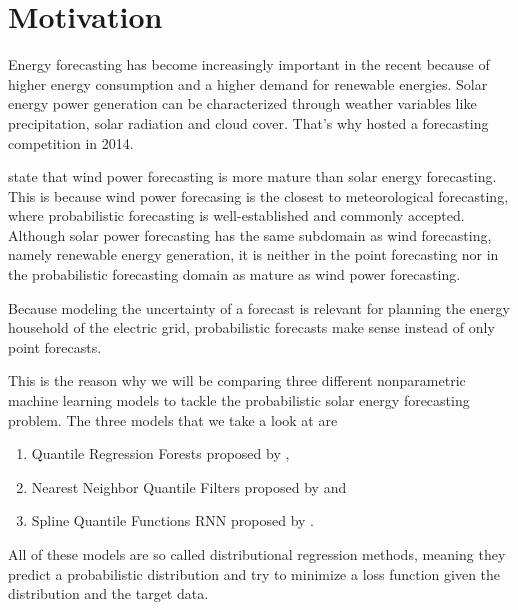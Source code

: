 \section{Motivation}
\label{sec:motivation}

Energy forecasting has become increasingly important in the recent 
because of higher energy consumption and a higher demand for renewable energies. 
Solar energy power generation can be characterized through weather variables like 
precipitation, solar radiation and cloud cover. 
That's why \Textcite{Hong2016} hosted a forecasting competition in 2014. 

\Textcite{Hong2016} state that wind power forecasting is 
more mature than solar energy forecasting. This is because 
wind power forecasing is the closest to meteorological forecasting, 
where probabilistic forecasting is well-established and commonly accepted.
Although solar power forecasting has the same subdomain as wind forecasting, 
namely renewable energy generation, it is neither in the 
point forecasting nor in the probabilistic forecasting domain as mature 
as wind power forecasting. 

Because modeling the uncertainty of a forecast is relevant for planning 
the energy household of the electric grid, probabilistic forecasts 
make sense instead of only point forecasts. 

This is the reason why we will be comparing three different nonparametric 
machine learning models to tackle the probabilistic solar energy forecasting 
problem. 
The three models that we take a look at are 
\begin{enumerate}
    \item Quantile Regression Forests proposed by \Textcite{Meinshausen2006},
    \item Nearest Neighbor Quantile Filters proposed by \Textcite{Ordiano2019} and
    \item Spline Quantile Functions RNN proposed by \Textcite{Gasthaus2019}.
\end{enumerate}
All of these models are so called distributional regression methods, meaning 
they predict a probabilistic distribution and try to minimize a loss function 
given the distribution and the target data.